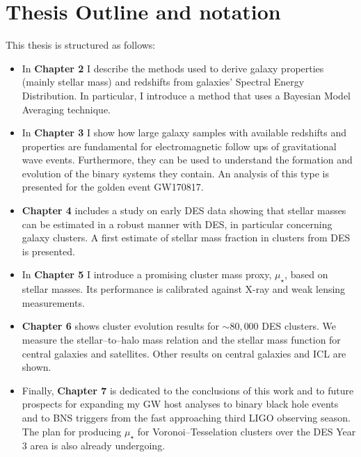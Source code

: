 \section{Thesis Outline and notation}

This thesis is structured as follows:

\begin{itemize}
\item In {\bf Chapter 2} I describe the methods used to derive galaxy properties (mainly stellar mass) and redshifts from galaxies' Spectral Energy Distribution. In particular, I introduce a method that uses a Bayesian Model Averaging technique.
\item In {\bf Chapter 3} I show how large galaxy samples with available redshifts and properties are fundamental for electromagnetic follow ups of gravitational wave events. Furthermore, they can be used to understand the formation and evolution of the binary systems they contain. An analysis of this type is presented for the golden event GW170817.
\item {\bf Chapter 4} includes a study on early DES data showing that stellar masses can be estimated in a robust manner with DES, in particular concerning galaxy clusters. A first estimate of stellar mass fraction in clusters from DES is presented.
\item In {\bf Chapter 5} I introduce a promising cluster mass proxy, $\mu_\star$, based on stellar masses. Its performance is calibrated against X-ray and weak lensing measurements.
\item {\bf Chapter 6} shows cluster evolution results for $\sim 80,000$ DES clusters. We measure the stellar--to--halo mass relation and the stellar mass function for central galaxies and satellites. Other results on central galaxies and ICL are shown.
\item Finally, {\bf Chapter 7} is dedicated to the conclusions of this work and to future prospects for expanding my GW host analyses to binary black hole events and to BNS triggers from the fast approaching third LIGO observing season. The plan for producing $\mu_\star$ for Voronoi--Tesselation clusters over the DES Year 3 area is also already undergoing.

\end{itemize}
